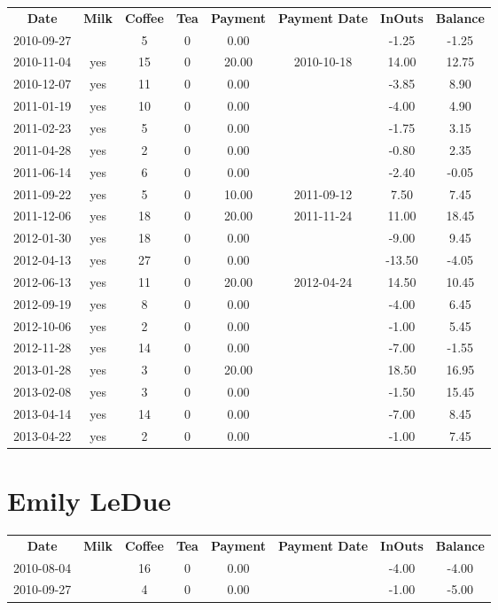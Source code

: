 \begin{center}
\begin{tabular}{cccccccc}
\textbf{Date} & \textbf{Milk} & \textbf{Coffee} & \textbf{Tea} & \textbf{Payment} & \textbf{Payment Date} & \textbf{InOuts} & \textbf{Balance} \\
2010-09-27 &  &  5 & 0 &  0.00 &  &  -1.25 & -1.25\\ 
2010-11-04 & yes & 15 & 0 & 20.00 & 2010-10-18 &  14.00 & 12.75\\ 
2010-12-07 & yes & 11 & 0 &  0.00 &  &  -3.85 &  8.90\\ 
2011-01-19 & yes & 10 & 0 &  0.00 &  &  -4.00 &  4.90\\ 
2011-02-23 & yes &  5 & 0 &  0.00 &  &  -1.75 &  3.15\\ 
2011-04-28 & yes &  2 & 0 &  0.00 &  &  -0.80 &  2.35\\ 
2011-06-14 & yes &  6 & 0 &  0.00 &  &  -2.40 & -0.05\\ 
2011-09-22 & yes &  5 & 0 & 10.00 & 2011-09-12 &   7.50 &  7.45\\ 
2011-12-06 & yes & 18 & 0 & 20.00 & 2011-11-24 &  11.00 & 18.45\\ 
2012-01-30 & yes & 18 & 0 &  0.00 &  &  -9.00 &  9.45\\ 
2012-04-13 & yes & 27 & 0 &  0.00 &  & -13.50 & -4.05\\ 
2012-06-13 & yes & 11 & 0 & 20.00 & 2012-04-24 &  14.50 & 10.45\\ 
2012-09-19 & yes &  8 & 0 &  0.00 &  &  -4.00 &  6.45\\ 
2012-10-06 & yes &  2 & 0 &  0.00 &  &  -1.00 &  5.45\\ 
2012-11-28 & yes & 14 & 0 &  0.00 &  &  -7.00 & -1.55\\ 
2013-01-28 & yes &  3 & 0 & 20.00 &  &  18.50 & 16.95\\ 
2013-02-08 & yes &  3 & 0 &  0.00 &  &  -1.50 & 15.45\\ 
2013-04-14 & yes & 14 & 0 &  0.00 &  &  -7.00 &  8.45\\ 
2013-04-22 & yes &  2 & 0 &  0.00 &  &  -1.00 &  7.45
\end{tabular}
\end{center}

\section{Emily LeDue}

\begin{center}
\begin{tabular}{cccccccc}
\textbf{Date} & \textbf{Milk} & \textbf{Coffee} & \textbf{Tea} & \textbf{Payment} & \textbf{Payment Date} & \textbf{InOuts} & \textbf{Balance} \\
2010-08-04 &  & 16 & 0 & 0.00 &  & -4.00 & -4.00\\ 
2010-09-27 &  &  4 & 0 & 0.00 &  & -1.00 & -5.00
\end{tabular}
\end{center}

